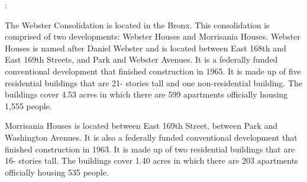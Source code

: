 :      

    

The Webster Consolidation is located in the Bronx. This consolidation is comprised of two developments: Webster Houses and Morrisania Houses. Webster Houses is named after Daniel Webster and is located between East 168th and East 169th Streets, and Park and Webster Avenues. It is a federally funded conventional development that finished construction in 1965. It is made up of five residential buildings that are 21- stories tall and one non-residential building. The buildings cover 4.53 acres in which there are 599 apartments officially housing 1,555 people.  

Morrisania Houses is located between East 169th Street, between Park and Washington Avenues. It is also a federally funded conventional development that finished construction in 1963.  It is made up of two residential buildings that are 16- stories tall. The buildings cover 1.40 acres in which there are 203 apartments officially housing 535 people.  